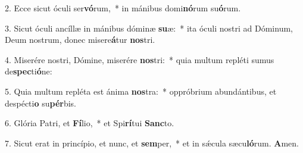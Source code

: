 2. Ecce sicut óculi ser\textbf{vó}rum,~*  in mánibus domi\textbf{nó}rum su\textbf{ó}rum.\

3. Sicut óculi ancíllæ in mánibus dóminæ \textbf{su}æ:~*  ita óculi nostri ad Dóminum, Deum nostrum, donec misere\textbf{á}tur \textbf{nos}tri.\

4. Miserére nostri, Dómine, miserére \textbf{nos}tri:~*  quia multum repléti sumus de\textbf{spec}ti\textbf{ó}ne:\

5. Quia multum repléta est ánima \textbf{nos}tra:~*  oppróbrium abundántibus, et despécti\textbf{o} su\textbf{pér}bis.\

6. Glória Patri, et \textbf{Fí}lio,~*  et Spi\textbf{rí}tui \textbf{Sanc}to.\

7. Sicut erat in princípio, et nunc, et \textbf{sem}per,~*  et in sǽcula sæcu\textbf{ló}rum. \textbf{A}men.\

